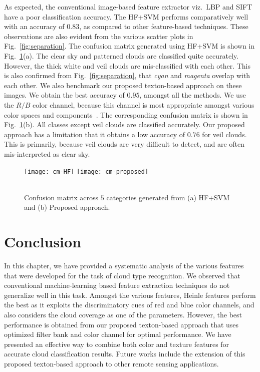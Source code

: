 As expected, the conventional image-based feature extractor viz.\ LBP and SIFT have a poor classification accuracy. The HF+SVM performs comparatively well with an accuracy of $0.83$, as compared to other feature-based techniques. These observations are also evident from the various scatter plots in Fig.~\ref{fig:separation}. The confusion matrix generated using HF+SVM is shown in Fig.~\ref{fig:cmatrix}(a). The clear sky and patterned clouds are classified quite accurately. However, the thick white and veil clouds are mis-classified with each other. This is also confirmed from Fig.~\ref{fig:separation}, that \emph{cyan} and \emph{magenta} overlap with each other. We also benchmark our proposed texton-based approach on these images. We obtain the best accuracy of $0.95$, amongst all the methods. We use the $R/B$ color channel, because this channel is most appropriate amongst various color spaces and components~\cite{ICIP2015b}. The corresponding confusion matrix is shown in Fig.~\ref{fig:cmatrix}(b). All classes except veil clouds are classified accurately. Our proposed approach has a limitation that it obtains a low accuracy of $0.76$ for veil clouds. This is primarily, because veil clouds are very difficult to detect, and are often mis-interpreted as clear sky. 

\begin{figure}[htb]
\centering
\texttt{[image: cm-HF]}
\texttt{[image: cm-proposed]}\\
\hspace{1cm}
\hspace{1cm}
\\
\caption[Confusion matrix of cloud classification results.]{Confusion matrix across $5$ categories generated from (a) HF+SVM and (b) Proposed approach.}
\label{fig:cmatrix}
\end{figure}





\section{Conclusion}
\label{sec:chap6-conclude}
In this chapter, we have provided a systematic analysis of the various features that were developed for the task of cloud type recognition. We observed that conventional machine-learning based feature extraction techniques do not generalize well in this task. Amongst the various features, Heinle features perform the best as it exploits the discriminatory cues of red and blue color channels, and also considers the cloud coverage as one of the parameters. However, the best performance is obtained from our proposed texton-based approach that uses optimized filter bank and color channel for optimal performance. We have presented an effective way to combine both color and texture features for accurate cloud classification results. Future works include the extension of this proposed texton-based approach to other remote sensing applications. 





